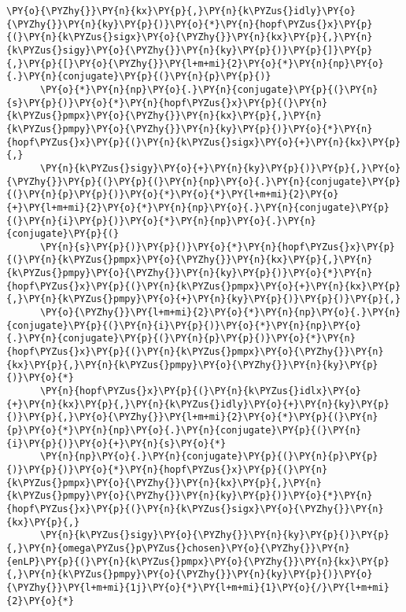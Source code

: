 \begin{Verbatim}[commandchars=\\\{\}]
      \PY{o}{\PYZhy{}}\PY{n}{kx}\PY{p}{,}\PY{n}{k\PYZus{}idly}\PY{o}{\PYZhy{}}\PY{n}{ky}\PY{p}{)}\PY{o}{*}\PY{n}{hopf\PYZus{}x}\PY{p}{(}\PY{n}{k\PYZus{}sigx}\PY{o}{\PYZhy{}}\PY{n}{kx}\PY{p}{,}\PY{n}{k\PYZus{}sigy}\PY{o}{\PYZhy{}}\PY{n}{ky}\PY{p}{)}\PY{p}{]}\PY{p}{,}\PY{p}{[}\PY{o}{\PYZhy{}}\PY{l+m+mi}{2}\PY{o}{*}\PY{n}{np}\PY{o}{.}\PY{n}{conjugate}\PY{p}{(}\PY{n}{p}\PY{p}{)}
      \PY{o}{*}\PY{n}{np}\PY{o}{.}\PY{n}{conjugate}\PY{p}{(}\PY{n}{s}\PY{p}{)}\PY{o}{*}\PY{n}{hopf\PYZus{}x}\PY{p}{(}\PY{n}{k\PYZus{}pmpx}\PY{o}{\PYZhy{}}\PY{n}{kx}\PY{p}{,}\PY{n}{k\PYZus{}pmpy}\PY{o}{\PYZhy{}}\PY{n}{ky}\PY{p}{)}\PY{o}{*}\PY{n}{hopf\PYZus{}x}\PY{p}{(}\PY{n}{k\PYZus{}sigx}\PY{o}{+}\PY{n}{kx}\PY{p}{,}
      \PY{n}{k\PYZus{}sigy}\PY{o}{+}\PY{n}{ky}\PY{p}{)}\PY{p}{,}\PY{o}{\PYZhy{}}\PY{p}{(}\PY{p}{(}\PY{n}{np}\PY{o}{.}\PY{n}{conjugate}\PY{p}{(}\PY{n}{p}\PY{p}{)}\PY{o}{*}\PY{o}{*}\PY{l+m+mi}{2}\PY{o}{+}\PY{l+m+mi}{2}\PY{o}{*}\PY{n}{np}\PY{o}{.}\PY{n}{conjugate}\PY{p}{(}\PY{n}{i}\PY{p}{)}\PY{o}{*}\PY{n}{np}\PY{o}{.}\PY{n}{conjugate}\PY{p}{(}
      \PY{n}{s}\PY{p}{)}\PY{p}{)}\PY{o}{*}\PY{n}{hopf\PYZus{}x}\PY{p}{(}\PY{n}{k\PYZus{}pmpx}\PY{o}{\PYZhy{}}\PY{n}{kx}\PY{p}{,}\PY{n}{k\PYZus{}pmpy}\PY{o}{\PYZhy{}}\PY{n}{ky}\PY{p}{)}\PY{o}{*}\PY{n}{hopf\PYZus{}x}\PY{p}{(}\PY{n}{k\PYZus{}pmpx}\PY{o}{+}\PY{n}{kx}\PY{p}{,}\PY{n}{k\PYZus{}pmpy}\PY{o}{+}\PY{n}{ky}\PY{p}{)}\PY{p}{)}\PY{p}{,}
      \PY{o}{\PYZhy{}}\PY{l+m+mi}{2}\PY{o}{*}\PY{n}{np}\PY{o}{.}\PY{n}{conjugate}\PY{p}{(}\PY{n}{i}\PY{p}{)}\PY{o}{*}\PY{n}{np}\PY{o}{.}\PY{n}{conjugate}\PY{p}{(}\PY{n}{p}\PY{p}{)}\PY{o}{*}\PY{n}{hopf\PYZus{}x}\PY{p}{(}\PY{n}{k\PYZus{}pmpx}\PY{o}{\PYZhy{}}\PY{n}{kx}\PY{p}{,}\PY{n}{k\PYZus{}pmpy}\PY{o}{\PYZhy{}}\PY{n}{ky}\PY{p}{)}\PY{o}{*}
      \PY{n}{hopf\PYZus{}x}\PY{p}{(}\PY{n}{k\PYZus{}idlx}\PY{o}{+}\PY{n}{kx}\PY{p}{,}\PY{n}{k\PYZus{}idly}\PY{o}{+}\PY{n}{ky}\PY{p}{)}\PY{p}{,}\PY{o}{\PYZhy{}}\PY{l+m+mi}{2}\PY{o}{*}\PY{p}{(}\PY{n}{p}\PY{o}{*}\PY{n}{np}\PY{o}{.}\PY{n}{conjugate}\PY{p}{(}\PY{n}{i}\PY{p}{)}\PY{o}{+}\PY{n}{s}\PY{o}{*}
      \PY{n}{np}\PY{o}{.}\PY{n}{conjugate}\PY{p}{(}\PY{n}{p}\PY{p}{)}\PY{p}{)}\PY{o}{*}\PY{n}{hopf\PYZus{}x}\PY{p}{(}\PY{n}{k\PYZus{}pmpx}\PY{o}{\PYZhy{}}\PY{n}{kx}\PY{p}{,}\PY{n}{k\PYZus{}pmpy}\PY{o}{\PYZhy{}}\PY{n}{ky}\PY{p}{)}\PY{o}{*}\PY{n}{hopf\PYZus{}x}\PY{p}{(}\PY{n}{k\PYZus{}sigx}\PY{o}{\PYZhy{}}\PY{n}{kx}\PY{p}{,}
      \PY{n}{k\PYZus{}sigy}\PY{o}{\PYZhy{}}\PY{n}{ky}\PY{p}{)}\PY{p}{,}\PY{n}{omega\PYZus{}p\PYZus{}chosen}\PY{o}{\PYZhy{}}\PY{n}{enLP}\PY{p}{(}\PY{n}{k\PYZus{}pmpx}\PY{o}{\PYZhy{}}\PY{n}{kx}\PY{p}{,}\PY{n}{k\PYZus{}pmpy}\PY{o}{\PYZhy{}}\PY{n}{ky}\PY{p}{)}\PY{o}{\PYZhy{}}\PY{l+m+mi}{1j}\PY{o}{*}\PY{l+m+mi}{1}\PY{o}{/}\PY{l+m+mi}{2}\PY{o}{*}

\end{Verbatim}
